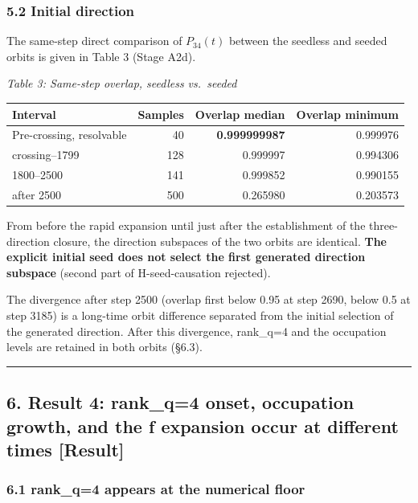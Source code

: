 \documentclass[
  a4paper,
]{article}
\newcounter{none} %
\begin{document}
\subsubsection{5.2 Initial direction}\label{initial-direction}

The same-step direct comparison of \(P_{34}(t)\) between the seedless
and seeded orbits is given in Table 3 (Stage A2d).

\emph{Table 3: Same-step overlap, seedless vs.~seeded}

{\def\LTcaptype{none} %
\begin{longtable}[]{@{}lrrr@{}}
\toprule\noalign{}
Interval & Samples & Overlap median & Overlap minimum \\
\midrule\noalign{}
\endhead
\bottomrule\noalign{}
\endlastfoot
Pre-crossing, resolvable & 40 & \textbf{0.999999987} & 0.999976 \\
crossing--1799 & 128 & 0.999997 & 0.994306 \\
1800--2500 & 141 & 0.999852 & 0.990155 \\
after 2500 & 500 & 0.265980 & 0.203573 \\
\end{longtable}
}

From before the rapid expansion until just after the establishment of
the three-direction closure, the direction subspaces of the two orbits
are identical. \textbf{The explicit initial seed does not select the
first generated direction subspace} (second part of H-seed-causation
rejected).

The divergence after step 2500 (overlap first below 0.95 at step 2690,
below 0.5 at step 3185) is a long-time orbit difference separated from
the initial selection of the generated direction. After this divergence,
rank\_q=4 and the occupation levels are retained in both orbits (§6.3).

\begin{center}\rule{0.5\linewidth}{0.5pt}\end{center}

\subsection{6. Result 4: rank\_q=4 onset, occupation growth, and the f
expansion occur at different times
{[}Result{]}}\label{result-4-rank_q4-onset-occupation-growth-and-the-f-expansion-occur-at-different-times-result}

\subsubsection{6.1 rank\_q=4 appears at the numerical
floor}\label{rank_q4-appears-at-the-numerical-floor}
\end{document}
